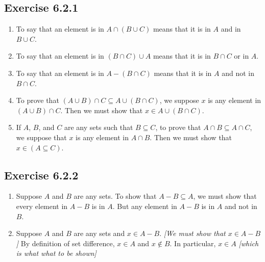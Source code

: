 \documentclass{article}
\newcommand{\In}{\! \in \!}
\newcommand{\Exercise}[1]{\subsection{Exercise #1}}
\begin{document}
	\Exercise{6.2.1}
	
	\begin{enumerate}[label=\textbf{\alph*.}]
		\item To say that an element is in $A \cap (B \cup C)$ means that it is in $A$ and in $B \cup C$.
		
		\item To say that an element is in $(B \cap C) \cup A$ means that it is in $B \cap C$ or in $A$.
		
		\item To say that an element is in $A - (B \cap C)$ means that it is in $A$ and not in $B\cap C$.
		
		\item To prove  that $(A \cup B) \cap C \subseteq A \cup (B \cap C )$, we suppose $x$ is any element in $(A \cup B) \cap C$. Then we must show that $x \In A \cup (B \cap C )$.
		
		\item If $A$, $B$, and $C$  are any sets such that $B \subseteq C$, to prove that $A \cap B \subseteq A \cap C$, we suppose that $x$ is any element in $A \cap B$. Then we must show  that $x \In (A \subseteq C)$.
	\end{enumerate}
	
	\Exercise{6.2.2}
	
	\begin{enumerate}[label=\textbf{\alph*.}]
		\item Suppose $A$ and $B$ are any sets. To show that $A-B \subseteq A$, we must show that every element in $A-B$ is in $A$. But any element in $A-B$ is in $A$ and not in $B$.
		
		\item Suppose $A$ and $B$ are any sets and $x\In A-B$. \textit{[We must show that $x \In A-B$]} By definition of set difference, $x \In A$ and $x \notin B$. In particular, $x \In A$ \textit{[which is what what to be shown]}
	\end{enumerate}
\end{document}

